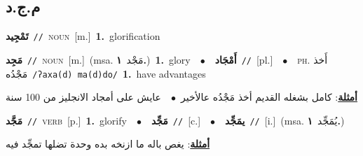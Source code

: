 \documentclass[10pt,a4paper,twoside]{article} %
\begin{document}
\begin{multicols}{2}
\vspace{-3mm}
\subsection*{\color{blue}\foreignlanguage{arabic}{م.ج.د}\color{blue}{}} 

{\setlength\topsep{0pt}\textbf{\foreignlanguage{arabic}{تَمْجِيد}}\ {\color{gray}\texttt{//}\color{black}}\ \textsc{noun}\ [m.]\ \textbf{1.}~glorification\ } \vspace{2mm}

{\setlength\topsep{0pt}\textbf{\foreignlanguage{arabic}{مَجِد}}\ {\color{gray}\texttt{//}\color{black}}\ \textsc{noun}\ [m.]\ \color{gray}(msa. \foreignlanguage{arabic}{مَجْد}~\foreignlanguage{arabic}{\textbf{١.}})\color{black}\ \textbf{1.}~glory\ \ $\bullet$\ \ \setlength\topsep{0pt}\textbf{\foreignlanguage{arabic}{أَمْجَاد}}\ {\color{gray}\texttt{//}\color{black}}\ [pl.]\ \ $\bullet$\ \ \textsc{ph.} \color{gray} \foreignlanguage{arabic}{أَخذ مَجْدُه}\color{black}\ {\color{gray}\texttt{/{\sffamily ʔaxa(d) ma(d)do}/}\color{black}}\ \textbf{1.}~have advantages\  \begin{flushright}\color{gray}\foreignlanguage{arabic}{\textbf{\underline{\foreignlanguage{arabic}{أمثلة}}}: كامل بشغله القديم أخذ مَجْدُه عالأخير\ $\bullet$\ \  عايش على أمجاد الانجليز من 100 سنة}\end{flushright}\color{black}} \vspace{2mm}

{\setlength\topsep{0pt}\textbf{\foreignlanguage{arabic}{مَجَّد}}\ {\color{gray}\texttt{//}\color{black}}\ \textsc{verb}\ [p.]\ \textbf{1.}~glorify\ \ $\bullet$\ \ \setlength\topsep{0pt}\textbf{\foreignlanguage{arabic}{مَجِّد}}\ {\color{gray}\texttt{//}\color{black}}\ [c.]\ \ $\bullet$\ \ \setlength\topsep{0pt}\textbf{\foreignlanguage{arabic}{يمَجِّد}}\ {\color{gray}\texttt{//}\color{black}}\ [i.]\ \color{gray}(msa. \foreignlanguage{arabic}{يُمَجِّد}~\foreignlanguage{arabic}{\textbf{١.}})\color{black}\  \begin{flushright}\color{gray}\foreignlanguage{arabic}{\textbf{\underline{\foreignlanguage{arabic}{أمثلة}}}: يغص باله ما ازنخه بده وحدة تضلها تمجِّد فيه}\end{flushright}\color{black}} \vspace{2mm}


\end{multicols}
\end{document}
